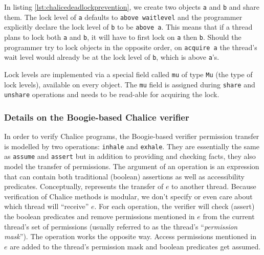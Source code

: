 In listing \ref{lst:chalicedeadlockprevention}, we create two objects \lstinline!a! and \lstinline!b! and share them. 
The lock level of \lstinline!a! defaults to \lstinline!above waitlevel! and the programmer explicitly declare the lock level of \lstinline!b! to be \lstinline!above a!.
This means that if a thread plans to lock both \lstinline!a! and \lstinline!b!, it will have to first lock on \lstinline!a! then \lstinline!b!.
Should the programmer try to lock objects in the opposite order, on \lstinline[language=Chalice]!acquire a! the thread's wait level would already be at the lock level of \lstinline!b!, which is above \lstinline!a!'s.

Lock levels are implemented via a special field called \lstinline!mu! of type \lstinline!Mu! (the type of lock levels), available on every object. 
The \lstinline!mu! field is assigned during \lstinline[language=Chalice]!share! and \lstinline[language=Chalice]!unshare! operations and needs to be read-able for acquiring the lock.

\subsubsection{Details on the Boogie-based Chalice verifier}
In order to verify Chalice programs, the Boogie-based verifier permission transfer is modelled by two operations: \lstinline[language=SIL]!inhale! and \lstinline[language=SIL]!exhale!. 
They are essentially the same as \lstinline[language=SIL]!assume! and \lstinline[language=SIL]!assert! but in addition to providing and checking facts, they also model the transfer of permissions.
The argument of an \exhale{} operation is an expression that can contain both traditional (boolean) assertions as well as accessibility predicates. 
Conceptually,  represents the transfer of $e$ to another thread. 
Because verification of Chalice methods is modular, we don't specify or even care about which thread will ``receive'' $e$.
For each \exhale operation, the verifier will check (assert) the boolean predicates and remove permissions mentioned in $e$ from the current thread's set of permissions (usually referred to as the thread's ``\emph{permission mask}'').
The  operation works the opposite way. Access permissions mentioned in $e$ are added to the thread's permission mask and boolean predicates get assumed.
